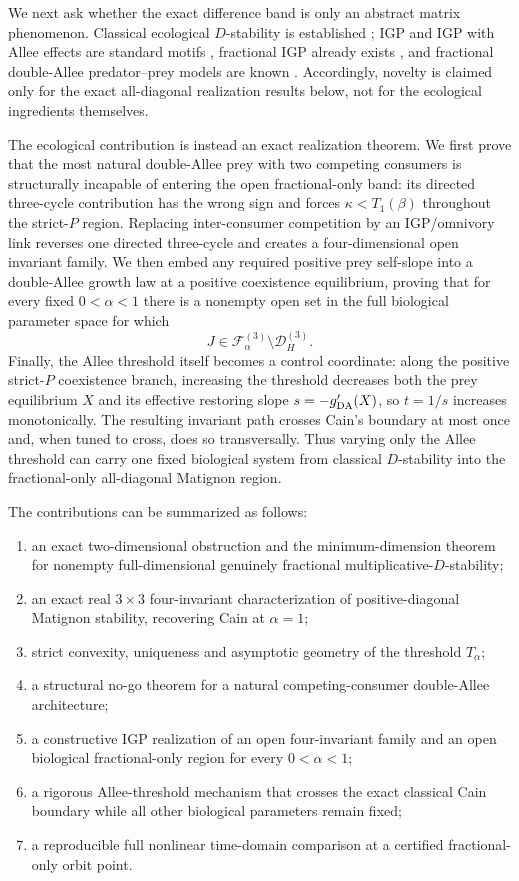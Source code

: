 We next ask whether the exact difference band is only an abstract matrix phenomenon. Classical ecological \(D\)-stability is established \cite{HouBaigent2015,ChenWangLiu2024}; IGP and IGP with Allee effects are standard motifs \cite{HoltPolis1997,BaiKangRuanWang2021}, fractional IGP already exists \cite{Panja2019}, and fractional double-Allee predator--prey models are known \cite{FractalFract2026DoubleAllee,Mondal2025}. Accordingly, novelty is claimed only for the exact all-diagonal realization results below, not for the ecological ingredients themselves.

The ecological contribution is instead an exact realization theorem. We first prove that the most natural double-Allee prey with two competing consumers is structurally incapable of entering the open fractional-only band: its directed three-cycle contribution has the wrong sign and forces \(\kappa<T_1(\beta)\) throughout the strict-\(P\) region. Replacing inter-consumer competition by an IGP/omnivory link reverses one directed three-cycle and creates a four-dimensional open invariant family. We then embed any required positive prey self-slope into a double-Allee growth law at a positive coexistence equilibrium, proving that for every fixed \(0<\alpha<1\) there is a nonempty open set in the full biological parameter space for which
\[
 J\in\mathcal F_\alpha^{(3)}
 \setminus
 \mathcal D_H^{(3)}.
\]
Finally, the Allee threshold itself becomes a control coordinate: along the positive strict-\(P\) coexistence branch, increasing the threshold decreases both the prey equilibrium \(X\) and its effective restoring slope \(s=-g'_{\rm DA}(X)\), so \(t=1/s\) increases monotonically. The resulting invariant path crosses Cain's boundary at most once and, when tuned to cross, does so transversally. Thus varying only the Allee threshold can carry one fixed biological system from classical \(D\)-stability into the fractional-only all-diagonal Matignon region.

The contributions can be summarized as follows:
\begin{enumerate}[leftmargin=*,itemsep=1pt]
\item an exact two-dimensional obstruction and the minimum-dimension theorem for nonempty full-dimensional genuinely fractional multiplicative-\(D\)-stability;
\item an exact real \(3\times3\) four-invariant characterization of positive-diagonal Matignon stability, recovering Cain at \(\alpha=1\);
\item strict convexity, uniqueness and asymptotic geometry of the threshold \(T_\alpha\);
\item a structural no-go theorem for a natural competing-consumer double-Allee architecture;
\item a constructive IGP realization of an open four-invariant family and an open biological fractional-only region for every \(0<\alpha<1\);
\item a rigorous Allee-threshold mechanism that crosses the exact classical Cain boundary while all other biological parameters remain fixed;
\item a reproducible full nonlinear time-domain comparison at a certified fractional-only orbit point.
\end{enumerate}

